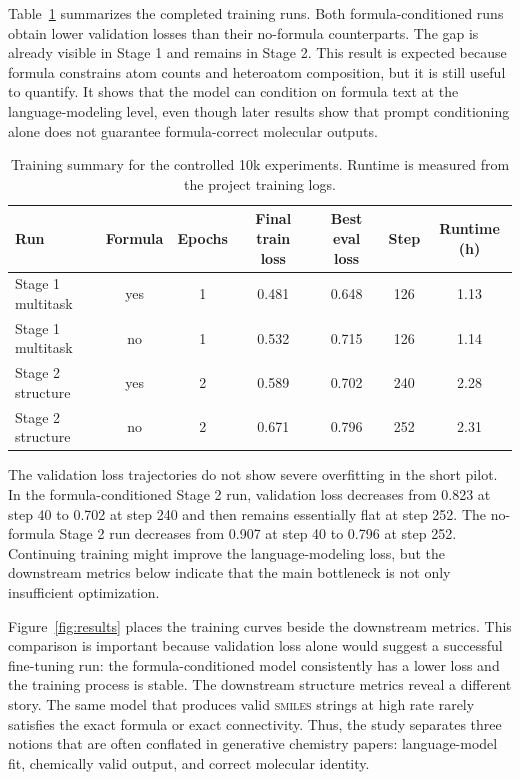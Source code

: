 \documentclass{article}
\newcommand{\smiles}{\textsc{smiles}}
\begin{document}
Table~\ref{tab:training} summarizes the completed training runs. Both formula-conditioned runs obtain lower validation losses than their no-formula counterparts. The gap is already visible in Stage 1 and remains in Stage 2. This result is expected because formula constrains atom counts and heteroatom composition, but it is still useful to quantify. It shows that the model can condition on formula text at the language-modeling level, even though later results show that prompt conditioning alone does not guarantee formula-correct molecular outputs.

\begin{table}[t]
\centering
\caption{Training summary for the controlled 10k experiments. Runtime is measured from the project training logs.}
\label{tab:training}
\small
\begin{tabular}{lcccccc}
\toprule
Run & Formula & Epochs & Final train loss & Best eval loss & Step & Runtime (h) \\
\midrule
Stage 1 multitask & yes & 1 & 0.481 & 0.648 & 126 & 1.13 \\
Stage 1 multitask & no  & 1 & 0.532 & 0.715 & 126 & 1.14 \\
Stage 2 structure & yes & 2 & 0.589 & 0.702 & 240 & 2.28 \\
Stage 2 structure & no  & 2 & 0.671 & 0.796 & 252 & 2.31 \\
\bottomrule
\end{tabular}
\end{table}

The validation loss trajectories do not show severe overfitting in the short pilot. In the formula-conditioned Stage 2 run, validation loss decreases from 0.823 at step 40 to 0.702 at step 240 and then remains essentially flat at step 252. The no-formula Stage 2 run decreases from 0.907 at step 40 to 0.796 at step 252. Continuing training might improve the language-modeling loss, but the downstream metrics below indicate that the main bottleneck is not only insufficient optimization.

Figure~\ref{fig:results} places the training curves beside the downstream metrics. This comparison is important because validation loss alone would suggest a successful fine-tuning run: the formula-conditioned model consistently has a lower loss and the training process is stable. The downstream structure metrics reveal a different story. The same model that produces valid \smiles{} strings at high rate rarely satisfies the exact formula or exact connectivity. Thus, the study separates three notions that are often conflated in generative chemistry papers: language-model fit, chemically valid output, and correct molecular identity.
\end{document}
